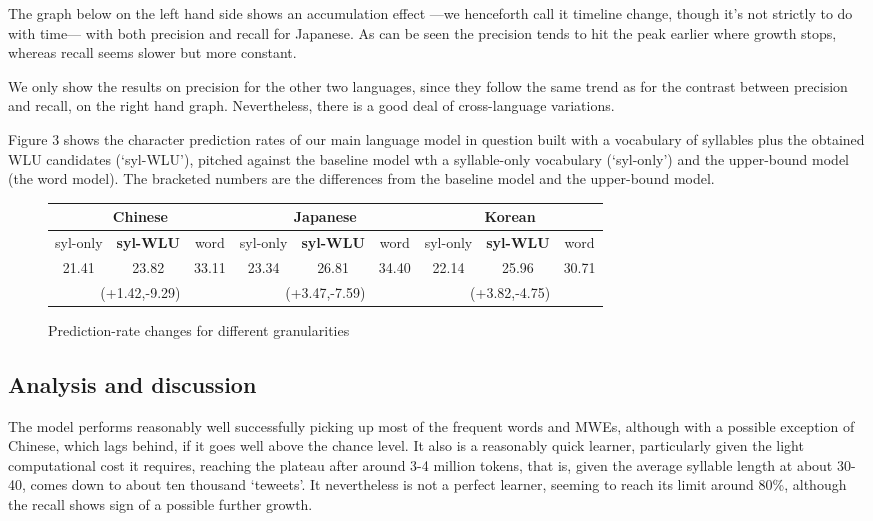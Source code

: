 \documentclass[a4]{article}
\begin{document}
 The graph below on the left hand side shows an accumulation effect ---we henceforth call it timeline change, though it's not strictly to do with time--- with both precision and recall for Japanese. As can be seen the precision tends to hit the peak earlier where growth stops, whereas recall seems slower but more constant. 

We only show the results on precision for the other two languages, since they follow the same trend as for the contrast between precision and recall, on the right hand graph. Nevertheless, there is a good deal of cross-language variations. 

Figure 3 shows the character prediction rates of our main language model in question built with a vocabulary of syllables plus the obtained WLU candidates (`syl-WLU'), pitched against the baseline model wth a syllable-only vocabulary (`syl-only') and the upper-bound model (the word model). The bracketed numbers are the differences from the baseline model and the upper-bound model.




\begin{figure}[b]
\centering
\begin{tabular}{c|c|c|c|c|c|c|c|c}


\multicolumn{3}{c|}{Chinese} & \multicolumn{3}{|c|}{Japanese} & \multicolumn{3}{|c}{Korean} \\

\hline
syl-only & {\bf syl-WLU} & word & syl-only & {\bf syl-WLU} & word & syl-only & {\bf syl-WLU} & word\\
\hline
21.41 & 23.82  & 33.11 & 23.34 & 26.81 & 34.40  & 22.14 & 25.96 & 30.71\\
\hline
\multicolumn{3}{c|}{(+1.42,-9.29)} & \multicolumn{3}{c|}{(+3.47,-7.59)} & \multicolumn{3}{c}{(+3.82,-4.75)}


\end{tabular}
\caption{Prediction-rate changes for different granularities}
\end{figure}


\subsection{Analysis and discussion}

The model performs reasonably well successfully picking up most of the frequent words and MWEs, although  with a possible exception of Chinese,  which lags behind, if it goes well above the chance level. It also is a reasonably quick learner, particularly given the light computational cost it requires, reaching the plateau after around 3-4 million tokens, that is, given the average syllable length at about 30-40, comes down to about ten thousand `teweets'. It nevertheless is not a perfect learner, seeming to reach its limit around 80\%, although the recall shows sign of a possible further growth.
\end{document}
